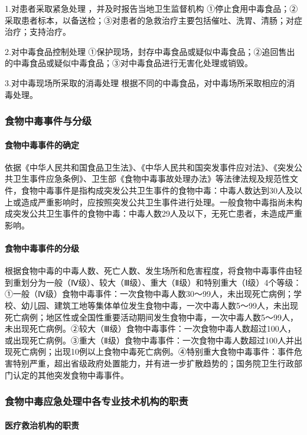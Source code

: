 1.对患者采取紧急处理 ，并及时报告当地卫生监督机构
①停止食用中毒食品；②采取患者标本，以备送检；③对患者的急救治疗主要包括催吐、洗胃、清肠；对症治疗；支持治疗。

2.对中毒食品控制处理
①保护现场，封存中毒食品或疑似中毒食品；②追回售出的中毒食品或疑似中毒食品；③对中毒食品进行无害化处理或销毁。

3.对中毒现场所采取的消毒处理
根据不同的中毒食品，对中毒场所采取相应的消毒处理。

\subsubsection{食物中毒事件与分级}

\paragraph{食物中毒事件的确定}

依据《中华人民共和国食品卫生法》、《中华人民共和国突发事件应对法》、《突发公共卫生事件应急条例》、卫生部《食物中毒事故处理办法》等法律法规及规范性文件，食物中毒事件是指构成突发公共卫生事件的食物中毒：中毒人数达到30人及以上或造成严重影响时，应按照突发公共卫生事件进行处理。一般食物中毒指尚未构成突发公共卫生事件的食物中毒：中毒人数29人及以下，无死亡患者，未造成严重影响。

\paragraph{食物中毒事件的分级}

根据食物中毒的中毒人数、死亡人数、发生场所和危害程度，将食物中毒事件由轻到重划分为一般（Ⅳ级）、较大（Ⅲ级）、重大（Ⅱ级）和特别重大（Ⅰ级）4个等级：①一般（Ⅳ级）食物中毒事件：一次食物中毒人数30～99人，未出现死亡病例；学校、幼儿园、建筑工地等集体单位发生食物中毒，一次中毒人数5～99人，未出现死亡病例；地区性或全国性重要活动期间发生食物中毒，一次中毒人数5～99人，未出现死亡病例。②较大（Ⅲ级）食物中毒事件：一次食物中毒人数超过100人，或出现死亡病例。③重大（Ⅱ级）食物中毒事件：一次食物中毒人数超过100人并出现死亡病例；出现10例以上食物中毒死亡病例。④特别重大食物中毒事件：事件危害特别严重，超出省级政府处置能力，并有进一步扩散趋势的；国务院卫生行政部门认定的其他突发食物中毒事件。

\subsubsection{食物中毒应急处理中各专业技术机构的职责}

\paragraph{医疗救治机构的职责}

